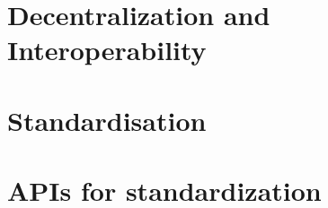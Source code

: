 \documentclass[12pt]{report}
\begin{document}




\clearpage
\clearpage

%

\chapter{Decentralization and Interoperability}

\chapter{Standardisation}

\chapter{APIs for standardization}


%

%
%
%

\end{document}
